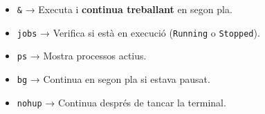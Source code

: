 \documentclass[
  12 pt,
  a4paper,
]{article}
\providecommand{\tightlist}{%
  \setlength{\itemsep}{0pt}\setlength{\parskip}{0pt}}
\begin{document}
\begin{itemize}
\tightlist
\item
  \texttt{\&} → Executa i \textbf{continua treballant} en segon pla.\\
\item
  \texttt{jobs} → Verifica si està en execució (\texttt{Running} o
  \texttt{Stopped}).\\
\item
  \texttt{ps} → Mostra processos actius.\\
\item
  \texttt{bg} → Continua en segon pla si estava pausat.\\
\item
  \texttt{nohup} → Continua després de tancar la terminal.
\end{itemize}
\end{document}
